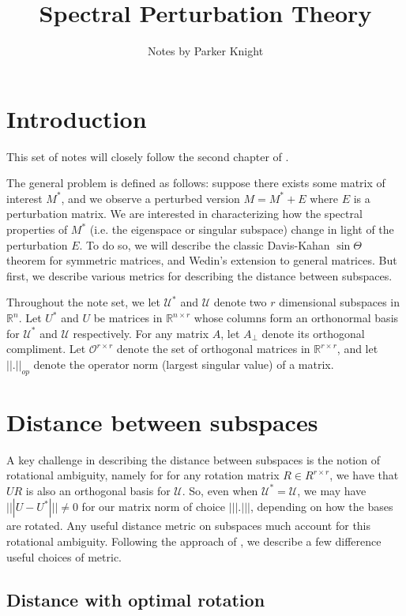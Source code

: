 \documentclass{amsart}
\title{Spectral Perturbation Theory}
\author{Notes by Parker Knight}
\newcommand{\R}{\mathbb{R}}
\newcommand{\calU}{\mathcal{U}}
\newcommand{\calO}{\mathcal{O}}
\begin{document}
\maketitle

\section{Introduction}

This set of notes will closely follow the second chapter of \cite{chen_spectral_2021}.

The general problem is defined as follows: suppose there exists some matrix of interest $M^{*}$, and we observe a perturbed version $M = M^{*} + E$ where $E$ is a perturbation matrix. We are interested in characterizing how the spectral properties of $M^{*}$ (i.e. the eigenspace or singular subspace) change in light of the perturbation $E$. To do so, we will describe the classic Davis-Kahan $\sin \Theta$ theorem for symmetric matrices, and Wedin's extension to general matrices. But first, we describe various metrics for describing the distance between subspaces.

Throughout the note set, we let $\calU^{*}$ and $\calU$ denote two $r$ dimensional subspaces in $\R^{n}$. Let $U^{*}$ and $U$ be matrices in $\R^{n \times r}$ whose columns form an orthonormal basis for $\calU^{*}$ and $\calU$ respectively. For any matrix $A$, let $A_{\perp}$ denote its orthogonal compliment. Let $\calO^{r \times r}$ denote the set of orthogonal matrices in $\R^{r \times r}$, and let $||.||_{op}$ denote the operator norm (largest singular value) of a matrix.

\section{Distance between subspaces}

A key challenge in describing the distance between subspaces is the notion of rotational ambiguity, namely for for any rotation matrix $R \in R^{r \times r}$, we have that $UR$ is also an orthogonal basis for $\calU$. So, even when $\calU^{*} = \calU$, we may have $|||U - U^*||| \neq 0$ for our matrix norm of choice $||| . |||$, depending on how the bases are rotated. Any useful distance metric on subspaces much account for this rotational ambiguity. Following the approach of \cite{chen_spectral_2021}, we describe a few difference useful choices of metric.

\subsection{Distance with optimal rotation}
\end{document}
